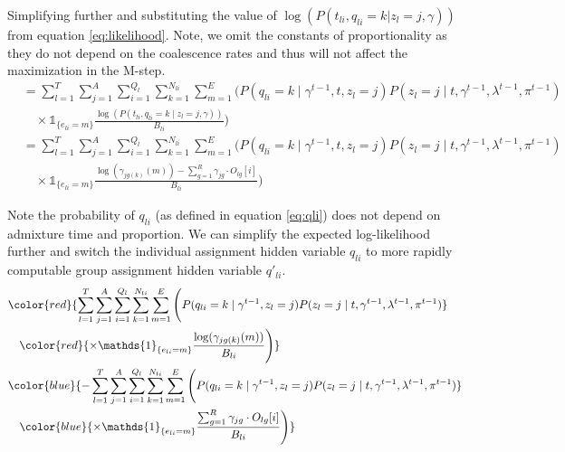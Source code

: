 Simplifying further and substituting the value of $\log(P( t_{li}, q_{l i} = k  | z_l = j, \gamma ))$ from equation \ref{eq:likelihood}. Note, we omit the constants of proportionality as they do not depend on the coalescence rates and thus will not affect the maximization in the M-step.
\begin{align}
    &= \sum_{l = 1}^T \sum_{j = 1}^A \sum_{i = 1}^{Q_l} \sum_{k = 1}^{N_{li}} \sum_{m = 1}^E \Bigg( 
        P(q_{li} = k \mid \gamma^{t-1}, t, z_l = j) P(z_l = j \mid t, \gamma^{t-1}, \lambda^{t-1}, \pi^{t-1}) \nonumber \\
    &\quad \times \mathds{1}_{\{e_{l i} = m\}} \frac{\log(P(t_{li}, q_{l i} = k \mid z_l = j, \gamma))}{B_{li}} \Bigg) \nonumber \\
    &= \sum_{l = 1}^T \sum_{j = 1}^A \sum_{i = 1}^{Q_l} \sum_{k = 1}^{N_{li}} \sum_{m = 1}^E \Bigg( 
        P(q_{li} = k \mid \gamma^{t-1}, t, z_l = j) P(z_l = j \mid t, \gamma^{t-1}, \lambda^{t-1}, \pi^{t-1}) \nonumber \\
    &\quad \times \mathds{1}_{\{e_{l i} = m\}} \frac{\log(\gamma_{jg(k)}(m)) - \sum_{g=1}^R \gamma_{jg} \cdot O_{lg}[i]}{B_{li}} \Bigg) 
\end{align}

Note the probability of $q_{li}$ (as defined in equation \ref{eq:qli}) does not depend on admixture time and proportion. We can simplify the expected log-likelihood further and switch the individual assignment hidden variable $q_{li}$ to more rapidly computable group assignment hidden variable $q'_{li}$. 
\begin{align}
   &\color{red}{\sum_{l = 1}^T \sum_{j = 1}^A \sum_{i = 1}^{Q_l} \sum_{k = 1}^{N_{li}} \sum_{m = 1}^E \Bigg( 
       P(q_{li} = k \mid \gamma^{t-1}, z_l = j) P(z_l = j \mid t, \gamma^{t-1}, \lambda^{t-1}, \pi^{t-1})} \nonumber \\
   &\quad \color{red}{\times \mathds{1}_{\{e_{l i} = m\}} \frac{\log(\gamma_{jg(k)}(m))}{B_{li}} \Bigg)} \nonumber \\
   &\color{blue}{- \sum_{l = 1}^T \sum_{j = 1}^A \sum_{i = 1}^{Q_l} \sum_{k = 1}^{N_{li}} \sum_{m = 1}^E \Bigg( 
       P(q_{li} = k \mid \gamma^{t-1}, z_l = j) P(z_l = j \mid t, \gamma^{t-1}, \lambda^{t-1}, \pi^{t-1})} \nonumber \\
   &\quad \color{blue}{\times \mathds{1}_{\{e_{l i} = m\}} \frac{\sum_{g=1}^R \gamma_{jg} \cdot O_{lg}[i]}{B_{li}} \Bigg)}
\end{align}


